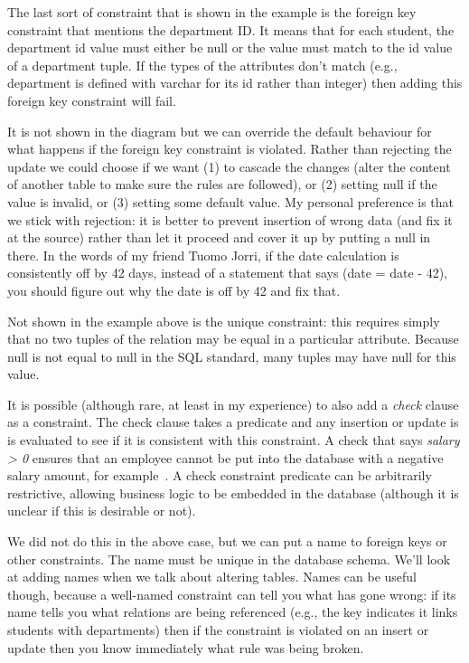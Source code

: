 The last sort of constraint that is shown in the example is the foreign key constraint that mentions the department ID. It means that for each student, the department id value must either be null or the value must match to the id value of a department tuple. If the types of the attributes don't match (e.g., department is defined with varchar for its id rather than integer) then adding this foreign key constraint will fail. 


It is not shown in the diagram but we can override the default behaviour for what happens if the foreign key constraint is violated. Rather than rejecting the update we could choose if we want (1) to cascade the changes (alter the content of another table to make sure the rules are followed), or (2) setting null if the value is invalid, or (3) setting some default value. My personal preference is that we stick with rejection: it is better to prevent insertion of wrong data (and fix it at the source) rather than let it proceed and cover it up by putting a null in there. In the words of my friend Tuomo Jorri, if the date calculation is consistently off by 42 days, instead of a statement that says (date = date - 42), you should figure out why the date is off by 42 and fix that.

Not shown in the example above is the unique constraint: this requires simply that no two tuples of the relation may be equal in a particular attribute. Because null is not equal to null in the SQL standard, many tuples may have null for this value.

It is possible (although rare, at least in my experience) to also add a \textit{check} clause as a constraint. The check clause takes a predicate and any insertion or update is is evaluated to see if it is consistent with this constraint. A check that says \textit{salary > 0} ensures that an employee cannot be put into the database with a negative salary amount, for example~\cite{dsc}. A check constraint predicate can be arbitrarily restrictive, allowing business logic to be embedded in the database (although it is unclear if this is desirable or not).

We did not do this in the above case, but we can put a name to foreign keys or other constraints. The name must be unique in the database schema. We'll look at adding names when we talk about altering tables. Names can be useful though, because a well-named constraint can tell you what has gone wrong: if its name tells you what relations are being referenced (e.g., the key indicates it links students with departments) then if the constraint is violated on an insert or update then you know immediately what rule was being broken.

